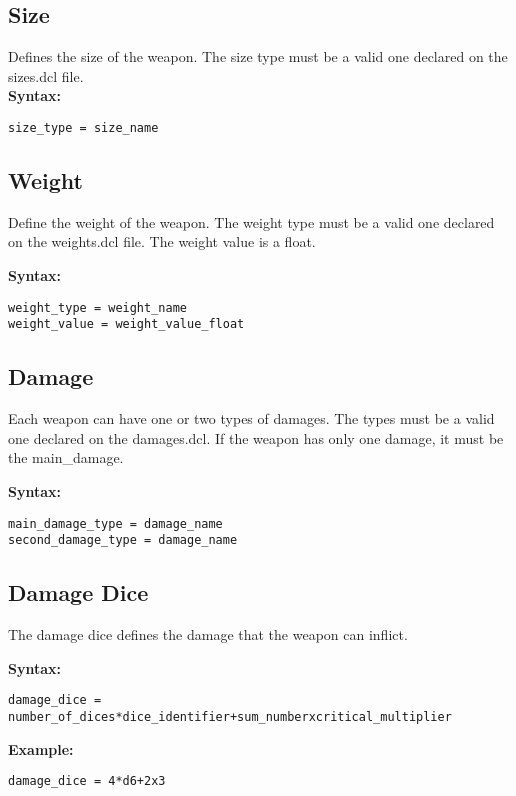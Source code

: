 \documentclass[letterpaper,12pt]{article}
\begin{document}
\subsection{Size}

Defines the size of the weapon. The size type must be a valid one
declared on the sizes.dcl file.\\

{\bf Syntax: }
\begin{verbatim}
size_type = size_name
\end{verbatim}

\subsection{Weight}

Define the weight of the weapon. The weight type must be a valid one declared
on the weights.dcl file. The weight value is a float.

{\bf Syntax:}
\begin{verbatim}
weight_type = weight_name
weight_value = weight_value_float
\end{verbatim}


\subsection{Damage}

Each weapon can have one or two types of damages. The types must be a valid one
declared on the damages.dcl. If the weapon has only one damage, it must be the
main\_damage.

{\bf Syntax:}
\begin{verbatim}
main_damage_type = damage_name
second_damage_type = damage_name
\end{verbatim}

\subsection{Damage Dice}

The damage dice defines the damage that the weapon can inflict.

{\bf Syntax:}
\begin{verbatim}
damage_dice = number_of_dices*dice_identifier+sum_numberxcritical_multiplier
\end{verbatim}

{\bf Example:}
\begin{verbatim}
damage_dice = 4*d6+2x3
\end{verbatim}
\end{document}
